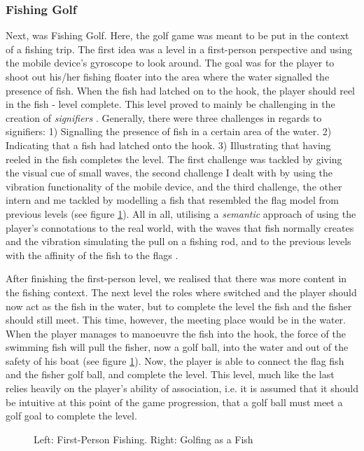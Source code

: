 \subsubsection{Fishing Golf}
Next, was Fishing Golf. Here, the golf game was meant to be put in the context of a fishing trip. The first idea was a level in a first-person perspective and using the mobile device's gyroscope to look around. The goal was for the player to shoot out his/her fishing floater into the area where the water signalled the presence of fish. When the fish had latched on to the hook, the player should reel in the fish - level complete. This level proved to mainly be challenging in the creation of \textit{signifiers} \cite{norman}. Generally, there were three challenges in regards to signifiers: 1) Signalling the presence of fish in a certain area of the water. 2) Indicating that a fish had latched onto the hook. 3) Illustrating that having reeled in the fish completes the level. The first challenge was tackled by giving the visual cue of small waves, the second challenge I dealt with by using the vibration functionality of the mobile device, and the third challenge, the other intern and me tackled by modelling a fish that resembled the flag model from previous levels (see figure \ref{Fishing}). All in all, utilising a \textit{semantic} approach of using the player's connotations to the real world, with the waves that fish normally creates and the vibration simulating the pull on a fishing rod, and to the previous levels with the affinity of the fish to the flags \cite{semantics}.

After finishing the first-person level, we realised that there was more content in the fishing context. The next level the roles where switched and the player should now act as the fish in the water, but to complete the level the fish and the fisher should still meet. This time, however, the meeting place would be in the water. When the player manages to manoeuvre the fish into the hook, the force of the swimming fish will pull the fisher, now a golf ball, into the water and out of the safety of his boat (see figure \ref{Fishing}). Now, the player is able to connect the flag fish and the fisher golf ball, and complete the level. This level, much like the last relies heavily on the player's ability of association, i.e. it is assumed that it should be intuitive at this point of the game progression, that a golf ball must meet a golf goal to complete the level.
\begin{center}
  \begin{figure}[!htb]
    \noindent{}
    \caption{Left: First-Person Fishing. Right: Golfing as a Fish}
    \label{Fishing}
  \end{figure}
\end{center}

